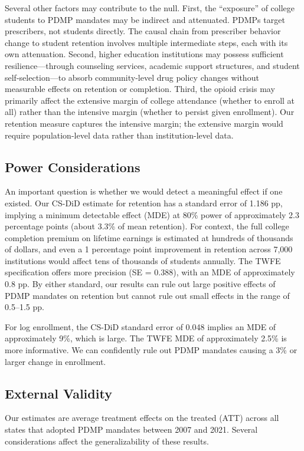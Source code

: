 \documentclass[12pt]{article}
\begin{document}
Several other factors may contribute to the null. First, the ``exposure'' of college students to PDMP mandates may be indirect and attenuated. PDMPs target prescribers, not students directly. The causal chain from prescriber behavior change to student retention involves multiple intermediate steps, each with its own attenuation. Second, higher education institutions may possess sufficient resilience---through counseling services, academic support structures, and student self-selection---to absorb community-level drug policy changes without measurable effects on retention or completion. Third, the opioid crisis may primarily affect the extensive margin of college attendance (whether to enroll at all) rather than the intensive margin (whether to persist given enrollment). Our retention measure captures the intensive margin; the extensive margin would require population-level data rather than institution-level data.

\subsection{Power Considerations}

An important question is whether we would detect a meaningful effect if one existed. Our CS-DiD estimate for retention has a standard error of 1.186 pp, implying a minimum detectable effect (MDE) at 80\% power of approximately 2.3 percentage points (about 3.3\% of mean retention). For context, the full college completion premium on lifetime earnings is estimated at hundreds of thousands of dollars, and even a 1 percentage point improvement in retention across 7,000 institutions would affect tens of thousands of students annually. The TWFE specification offers more precision (SE = 0.388), with an MDE of approximately 0.8 pp. By either standard, our results can rule out large positive effects of PDMP mandates on retention but cannot rule out small effects in the range of 0.5--1.5 pp.

For log enrollment, the CS-DiD standard error of 0.048 implies an MDE of approximately 9\%, which is large. The TWFE MDE of approximately 2.5\% is more informative. We can confidently rule out PDMP mandates causing a 3\% or larger change in enrollment.

\subsection{External Validity}

Our estimates are average treatment effects on the treated (ATT) across all states that adopted PDMP mandates between 2007 and 2021. Several considerations affect the generalizability of these results.
\end{document}
